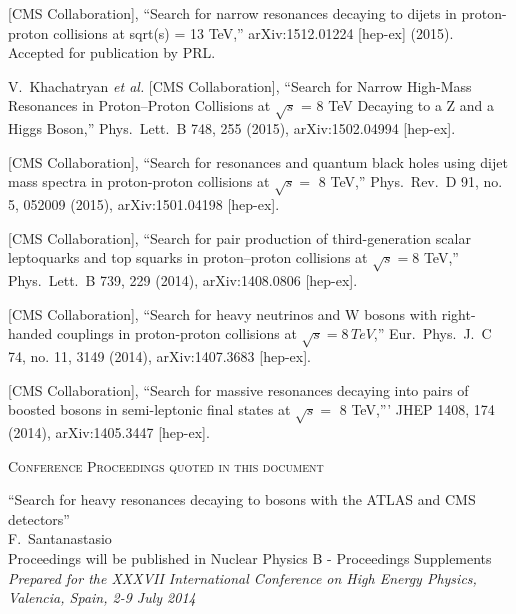 \documentclass[10pt, a4paper]{article}
\begin{document}
\begin{thebibliography}{599}


  [CMS Collaboration],
  ``Search for narrow resonances decaying to dijets in proton-proton collisions at sqrt(s) = 13 TeV,''
  arXiv:1512.01224 [hep-ex] (2015). Accepted for publication by PRL.

  V.~Khachatryan {\it et al.} [CMS Collaboration],
  ``Search for Narrow High-Mass Resonances in Proton–Proton Collisions at $\sqrt{s}$ = 8 TeV Decaying to a Z and a Higgs Boson,''
  Phys.\ Lett.\ B 748, 255 (2015), arXiv:1502.04994 [hep-ex].

  [CMS Collaboration],
  ``Search for resonances and quantum black holes using dijet mass spectra in proton-proton collisions at $\sqrt{s} =$ 8 TeV,''
  Phys.\ Rev.\ D 91, no. 5, 052009 (2015), arXiv:1501.04198 [hep-ex].

  [CMS Collaboration],
  ``Search for pair production of third-generation scalar leptoquarks and top squarks in proton–proton collisions at $\sqrt{s}=$8 TeV,''
  Phys.\ Lett.\ B 739, 229 (2014), arXiv:1408.0806 [hep-ex].

  [CMS Collaboration],
  ``Search for heavy neutrinos and $\mathrm {W}$ bosons with
  right-handed couplings in proton-proton collisions at $\sqrt{s} = 8 \, TeV $,''
  Eur.\ Phys.\ J.\ C 74, no. 11, 3149 (2014), arXiv:1407.3683 [hep-ex].

  [CMS Collaboration],
  ``Search for massive resonances decaying into pairs of boosted bosons in semi-leptonic final states at $\sqrt{s} =$ 8 TeV,'''
  JHEP 1408, 174 (2014), arXiv:1405.3447 [hep-ex].


\vspace{0.1cm} \begin{center} \textsc{Conference Proceedings quoted in
    this document} \end{center} \vspace{0.05cm}

  ``Search for heavy resonances decaying to bosons with the ATLAS and CMS detectors''
  \\{}F.~Santanastasio
   \\{} Proceedings will be published in Nuclear Physics B - Proceedings Supplements
  \\{}{\it Prepared for the XXXVII International Conference on High Energy Physics, Valencia, Spain, 2-9 July 2014}


\end{thebibliography}
\end{document}
